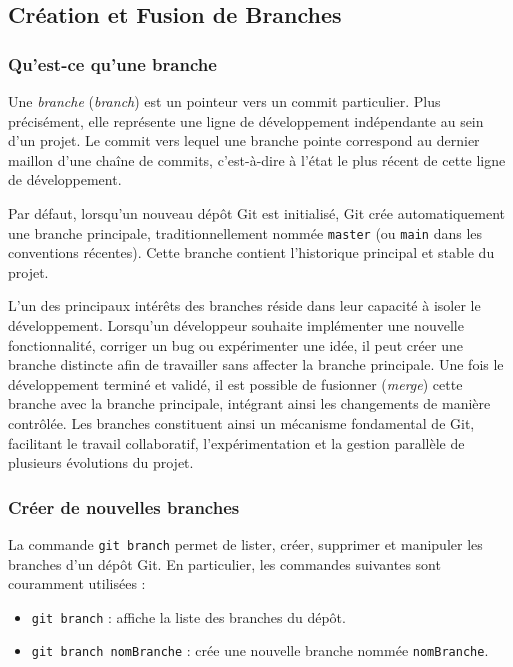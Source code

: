 \documentclass{article}
\begin{document}
\subsection{Création et Fusion de Branches}

\subsubsection{Qu’est-ce qu’une branche}

Une \emph{branche} (\emph{branch}) est un pointeur vers un commit particulier. Plus précisément, elle représente une ligne de développement indépendante au sein d’un projet. Le commit vers lequel une branche pointe correspond au dernier maillon d’une chaîne de commits, c’est-à-dire à l’état le plus récent de cette ligne de développement.

Par défaut, lorsqu’un nouveau dépôt Git est initialisé, Git crée automatiquement une branche principale, traditionnellement nommée \texttt{master} (ou \texttt{main} dans les conventions récentes). Cette branche contient l’historique principal et stable du projet.

L’un des principaux intérêts des branches réside dans leur capacité à isoler le développement. Lorsqu’un développeur souhaite implémenter une nouvelle fonctionnalité, corriger un bug ou expérimenter une idée, il peut créer une branche distincte afin de travailler sans affecter la branche principale. Une fois le développement terminé et validé, il est possible de fusionner (\emph{merge}) cette branche avec la branche principale, intégrant ainsi les changements de manière contrôlée.
Les branches constituent ainsi un mécanisme fondamental de Git, facilitant le travail collaboratif, 
l’expérimentation et la gestion parallèle de plusieurs évolutions du projet.


\subsubsection{Créer de nouvelles branches}

La commande \texttt{git branch} permet de lister, créer, supprimer et manipuler les branches d’un dépôt Git. En particulier, les commandes suivantes sont couramment utilisées :
\begin{itemize}
    \item \texttt{git branch} : affiche la liste des branches du dépôt.
    \item \texttt{git branch nomBranche} : crée une nouvelle branche nommée \texttt{nomBranche}.
\end{itemize}
\end{document}
